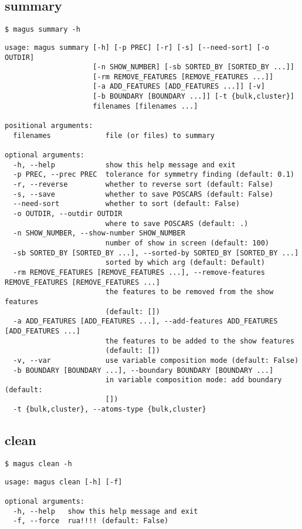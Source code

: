 \documentclass[12pt,oneside]{book}
\begin{document}
\subsection{summary}
\begin{tcolorbox}
    \begin{verbatim}
$ magus summary -h
    \end{verbatim}
    \tcblower
    \begin{verbatim}
usage: magus summary [-h] [-p PREC] [-r] [-s] [--need-sort] [-o OUTDIR]
                     [-n SHOW_NUMBER] [-sb SORTED_BY [SORTED_BY ...]]
                     [-rm REMOVE_FEATURES [REMOVE_FEATURES ...]]
                     [-a ADD_FEATURES [ADD_FEATURES ...]] [-v]
                     [-b BOUNDARY [BOUNDARY ...]] [-t {bulk,cluster}]
                     filenames [filenames ...]

positional arguments:
  filenames             file (or files) to summary

optional arguments:
  -h, --help            show this help message and exit
  -p PREC, --prec PREC  tolerance for symmetry finding (default: 0.1)
  -r, --reverse         whether to reverse sort (default: False)
  -s, --save            whether to save POSCARS (default: False)
  --need-sort           whether to sort (default: False)
  -o OUTDIR, --outdir OUTDIR
                        where to save POSCARS (default: .)
  -n SHOW_NUMBER, --show-number SHOW_NUMBER
                        number of show in screen (default: 100)
  -sb SORTED_BY [SORTED_BY ...], --sorted-by SORTED_BY [SORTED_BY ...]
                        sorted by which arg (default: Default)
  -rm REMOVE_FEATURES [REMOVE_FEATURES ...], --remove-features REMOVE_FEATURES [REMOVE_FEATURES ...]
                        the features to be removed from the show features
                        (default: [])
  -a ADD_FEATURES [ADD_FEATURES ...], --add-features ADD_FEATURES [ADD_FEATURES ...]
                        the features to be added to the show features
                        (default: [])
  -v, --var             use variable composition mode (default: False)
  -b BOUNDARY [BOUNDARY ...], --boundary BOUNDARY [BOUNDARY ...]
                        in variable composition mode: add boundary (default:
                        [])
  -t {bulk,cluster}, --atoms-type {bulk,cluster}
    \end{verbatim}
\end{tcolorbox}
\subsection{clean}
\begin{tcolorbox}
    \begin{verbatim}
$ magus clean -h
    \end{verbatim}
    \tcblower
    \begin{verbatim}
usage: magus clean [-h] [-f]

optional arguments:
  -h, --help   show this help message and exit
  -f, --force  rua!!!! (default: False)
    \end{verbatim}
\end{tcolorbox}
\end{document}
